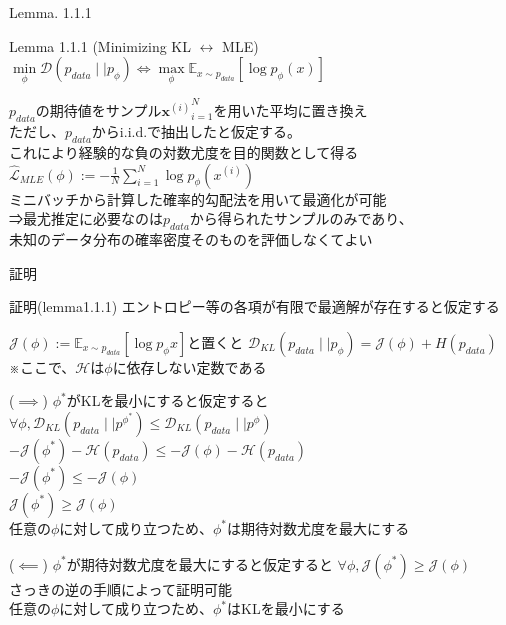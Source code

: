 \begin{frame}{Lemma. 1.1.1}
\begin{exampleblock}{Lemma 1.1.1 (Minimizing KL $\leftrightarrow$ MLE)}
    \centering$\min\limits_{\phi}\mathcal{D}(p_{data}\mid\mid p_{\phi})\iff \max\limits_{\phi}\mathbb{E}_{x\sim p_{data}}[\log p_{\phi}(x)]$
\end{exampleblock}
\vspace{1em}
$p_{data}$の期待値をサンプル${\boldsymbol{x}^{(i)}}_{i=1}^{N}$を用いた平均に置き換え\\
ただし、$p_{data}$からi.i.d.で抽出したと仮定する。\\
これにより経験的な負の対数尤度を目的関数として得る
\vspace{1em}
\centering$\hat{\mathcal{L}}_{MLE}(\phi) := -\frac{1}{N}\sum_{i=1}^{N}\log p_{\phi}(x^{(i)})$\\
\vspace{1em}
ミニバッチから計算した確率的勾配法を用いて最適化が可能\\
⇒最尤推定に必要なのは$p_{data}$から得られたサンプルのみであり、\\未知のデータ分布の確率密度そのものを評価しなくてよい

\end{frame}
\begin{frame}{証明}
    \begin{exampleblock}{証明(lemma1.1.1)}
エントロピー等の各項が有限で最適解が存在すると仮定する

\centering$\mathcal{J}(\phi) := \mathbb{E}_{x\sim p_{data}}[\log p_{\phi}{x}]$と置くと
\centering$\mathcal{D}_{KL}(p_{data}\mid\mid p_{\phi}) = \mathcal{J}(\phi) + H(p_{data})$\\
\small ※ここで、$\mathcal{H}は\phi$に依存しない定数である\\
\end{exampleblock}

\begin{exampleblock}{}
    ($\implies$)
$\phi^{*}$がKLを最小にすると仮定すると
\centering$\forall \phi,\mathcal{D}_{KL}(p_{data}\mid\mid p^{\phi^{*}}) \leq \mathcal{D}_{KL}(p_{data}\mid\mid p^{\phi})$
\centering$-\mathcal{J}(\phi^{*})-\mathcal{H}(p_{data}) \leq -\mathcal{J}(\phi)-\mathcal{H}(p_{data})$\\
\centering$-\mathcal{J}(\phi^{*}) \leq -\mathcal{J}(\phi)$\\
\centering$\mathcal{J}(\phi^{*}) \geq \mathcal{J}(\phi)$\\
任意の$\phi$に対して成り立つため、$\phi^{*}$は期待対数尤度を最大にする
\end{exampleblock}

\begin{exampleblock}{}
($\impliedby$)
$\phi^{*}$が期待対数尤度を最大にすると仮定すると
\centering$\forall \phi,\mathcal{J}(\phi^{*}) \geq \mathcal{J}(\phi)$\\
さっきの逆の手順によって証明可能\\
任意の$\phi$に対して成り立つため、$\phi^{*}$はKLを最小にする
\end{exampleblock}
\end{frame}
